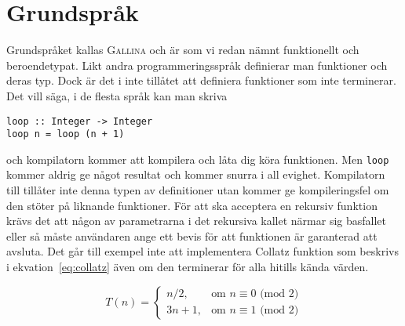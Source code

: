 \section{Grundspråk}
Grundspråket kallas \textsc{Gallina} och är som vi redan nämnt funktionellt och
beroendetypat. Likt andra programmeringsspråk definierar man funktioner och
deras typ. Dock är det i \coq{} inte tillåtet att definiera funktioner som inte
terminerar. Det vill säga, i de flesta språk kan man skriva
\begin{verbatim}
loop :: Integer -> Integer
loop n = loop (n + 1)
\end{verbatim}
och kompilatorn kommer att kompilera och låta dig köra funktionen. Men
\verb+loop+ kommer aldrig ge något resultat och kommer snurra i all evighet.
Kompilatorn till \coq{} tillåter inte denna typen av definitioner utan kommer
ge kompileringsfel om den stöter på liknande funktioner. För att \coq{}
ska acceptera en rekursiv funktion krävs det att någon av parametrarna i det
rekursiva kallet närmar sig basfallet eller så
måste användaren ange ett bevis för att funktionen är garanterad att avsluta.
Det går till exempel inte att implementera Collatz funktion som beskrivs i
ekvation~\ref{eq:collatz} även om den terminerar för alla hitills kända värden.

\begin{equation}
\label{eq:collatz}
T(n) = \left\{\begin{matrix} n/2, & \mbox{om }n\equiv0\mbox{ (mod 2)} \\ 3n+1,
                         & \mbox{om }n\equiv1\mbox{ (mod 2)} \end{matrix}\right.
\end{equation}



